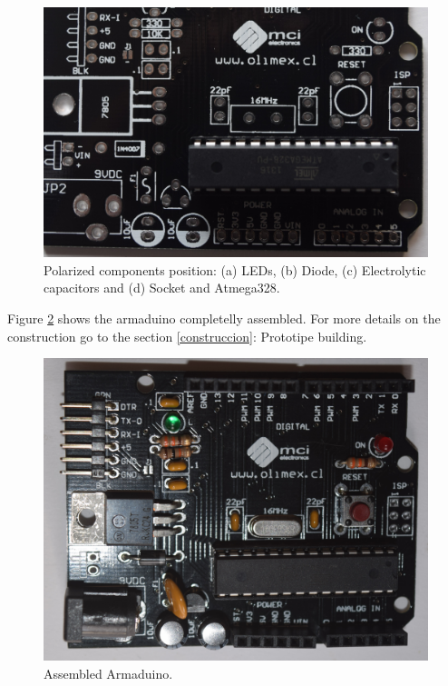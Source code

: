 \documentclass[12pt,letterpaper]{article}
\numberwithin{figure}{section}
\numberwithin{equation}{section}
\numberwithin{table}{section}
\begin{document}
\begin{figure}[H]
\begin{minipage}{0.5\textwidth}
    \end{minipage}%
    \begin{minipage}{0.5\textwidth}
    \centering
    \includegraphics[width=\linewidth]{Figuras/figure_11_d.jpg}   
    \end{minipage}

    \caption{Polarized components position: (a) LEDs, (b) Diode, (c) Electrolytic capacitors and (d) Socket and Atmega328.}
    \label{fig:11}
\end{figure}

Figure \ref{fig:12} shows the armaduino completelly assembled. For more details on the construction go to the section \ref{construccion}: Prototipe building.

\begin{figure}[H]
    \centering
    \includegraphics[scale=0.07]{Figuras/figure_12.jpg}
    \caption{Assembled Armaduino.}
    \label{fig:12}
\end{figure}
\end{document}
